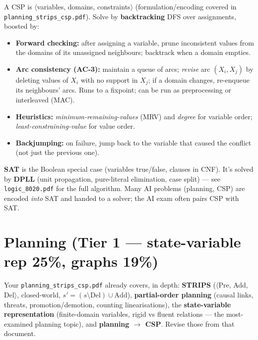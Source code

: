 \documentclass[11pt,a4paper]{article}
\begin{document}
\begin{must}[title=CSP solving algorithms]
A CSP is $\langle$variables, domains, constraints$\rangle$ (formulation/encoding covered in \texttt{planning\_strips\_csp.pdf}). Solve by \textbf{backtracking} DFS over assignments, boosted by:
\begin{itemize}[leftmargin=*,itemsep=0pt]
  \item \textbf{Forward checking:} after assigning a variable, prune inconsistent values from the domains of its unassigned neighbours; backtrack when a domain empties.
  \item \textbf{Arc consistency (AC-3):} maintain a queue of arcs; \emph{revise} arc $(X_i,X_j)$ by deleting values of $X_i$ with no support in $X_j$; if a domain changes, re-enqueue its neighbours' arcs. Runs to a fixpoint; can be run as preprocessing or interleaved (MAC).
  \item \textbf{Heuristics:} \emph{minimum-remaining-values} (MRV) and \emph{degree} for variable order; \emph{least-constraining-value} for value order.
  \item \textbf{Backjumping:} on failure, jump back to the variable that caused the conflict (not just the previous one).
\end{itemize}
\end{must}

\begin{useful}
\textbf{SAT} is the Boolean special case (variables true/false, clauses in CNF). It's solved by \textbf{DPLL} (unit propagation, pure-literal elimination, case split) --- see \texttt{logic\_8020.pdf} for the full algorithm. Many AI problems (planning, CSP) are encoded \emph{into} SAT and handed to a solver; the AI exam often pairs CSP with SAT.
\end{useful}

\section{Planning (Tier 1 --- state-variable rep 25\%, graphs 19\%)}

\begin{useful}
Your \texttt{planning\_strips\_csp.pdf} already covers, in depth: \textbf{STRIPS} ($\langle$Pre, Add, Del$\rangle$, closed-world, $s'=(s\setminus\mathrm{Del})\cup\mathrm{Add}$), \textbf{partial-order planning} (causal links, threats, promotion/demotion, counting linearisations), the \textbf{state-variable representation} (finite-domain variables, rigid vs fluent relations --- the most-examined planning topic), and \textbf{planning $\to$ CSP}. Revise those from that document.
\end{useful}
\end{document}
